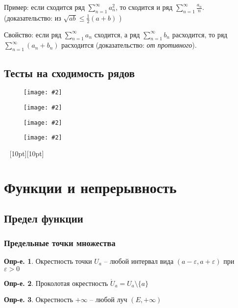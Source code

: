 \documentclass[a4paper,12pt]{article}
\numberwithin{figure}{section}
\theoremstyle{definition}
\newtheorem{definition}{Опр-е.}[section]
\theoremstyle{definition}
\def\DS{\displaystyle}
\def\eps{\varepsilon}
\def\ringU{\mathring{U}}
\def\leqs{\leqslant}
\def\vignette{\vspace{48pt} \noindent \hrulefill~ \raisebox{-8pt}[10pt][10pt]{\Huge\ding{102}}~ \hrulefill}
\newcommand\CenterFigure[2]{
	\begin{figure}[H]
		\centering
		\texttt{[image: \#2]}
	\end{figure}
}
\begin{document}
\bigbreak
Пример: если сходится ряд $\DS \sum_{n=1}^{\infty}a_n^2$,
то сходится и ряд $\DS \sum_{n=1}^{\infty}\frac{a_n}n$.
\\ \Big(доказательство: из $\sqrt{ab}\leqs\frac12(a+b)$ \Big)

\bigbreak
Свойство: если ряд $\DS \sum_{n=1}^{\infty}a_n$ сходится,
а ряд $\DS \sum_{n=1}^{\infty}b_n$ расходится,
то ряд $\DS \sum_{n=1}^{\infty} (a_n + b_n)$ расходится
(доказательство: \textit{от противного}).


\subsection{Тесты на сходимость рядов}

\CenterFigure{\linewidth}{rows-test-1.png}

\CenterFigure{\linewidth}{rows-test-2.png}

\CenterFigure{\linewidth}{rows-test-3.png}

\CenterFigure{\linewidth}{rows-test-4.png}



\vignette
\section{Функции и непрерывность}


\subsection{Предел функции}

\subsubsection{Предельные точки множества}

\begin{definition} Окрестность точки $U_a$ -- любой интервал вида $(a-\eps,a+\eps)$ при $\eps>0$ \end{definition}

\begin{definition} Проколотая окрестность $\ringU_a = U_a \setminus \{a\}$ \end{definition}

\begin{definition} Окрестность $+\infty$ -- любой луч $(E,+\infty)$ \end{definition}
\end{document}
